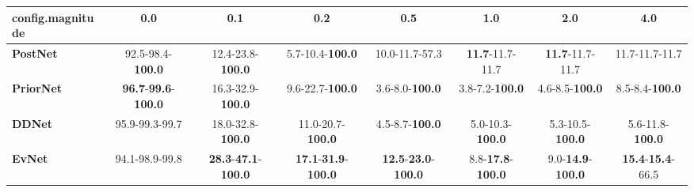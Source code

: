 \begin{tabular}{lccccccc}
\toprule
\textbf{config.magnitude} &                                         0.0 &                                         0.1 &                                         0.2 &                                         0.5 &                               1.0 &                               2.0 &                               4.0 \\
\midrule
\textbf{PostNet } &                    92.5-98.4-\textbf{100.0} &                    12.4-23.8-\textbf{100.0} &                     5.7-10.4-\textbf{100.0} &                              10.0-11.7-57.3 &           \textbf{11.7}-11.7-11.7 &           \textbf{11.7}-11.7-11.7 &                    11.7-11.7-11.7 \\
\textbf{PriorNet} &  \textbf{96.7}-\textbf{99.6}-\textbf{100.0} &                    16.3-32.9-\textbf{100.0} &                     9.6-22.7-\textbf{100.0} &                      3.6-8.0-\textbf{100.0} &            3.8-7.2-\textbf{100.0} &            4.6-8.5-\textbf{100.0} &            8.5-8.4-\textbf{100.0} \\
\textbf{DDNet   } &                              95.9-99.3-99.7 &                    18.0-32.8-\textbf{100.0} &                    11.0-20.7-\textbf{100.0} &                      4.5-8.7-\textbf{100.0} &           5.0-10.3-\textbf{100.0} &           5.3-10.5-\textbf{100.0} &           5.6-11.8-\textbf{100.0} \\
\textbf{EvNet   } &                              94.1-98.9-99.8 &  \textbf{28.3}-\textbf{47.1}-\textbf{100.0} &  \textbf{17.1}-\textbf{31.9}-\textbf{100.0} &  \textbf{12.5}-\textbf{23.0}-\textbf{100.0} &  8.8-\textbf{17.8}-\textbf{100.0} &  9.0-\textbf{14.9}-\textbf{100.0} &  \textbf{15.4}-\textbf{15.4}-66.5 \\
\bottomrule
\end{tabular}
